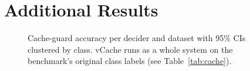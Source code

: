 \section{Additional Results}
\label{app:results}


\begin{figure}[h]
\centering
{}
\caption{Cache-guard accuracy per decider and dataset with 95\% CIs clustered by class. vCache runs as a whole system on the benchmark's original class labels (see Table~\ref{tab:cache}).}
\label{fig:cacheacc}
\end{figure}
